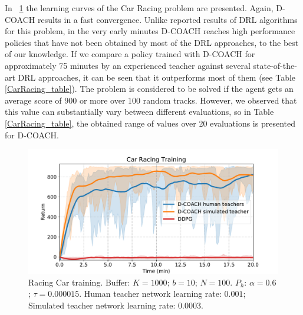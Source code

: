 In \figurename~{\ref{fig:racing_car_results}} the learning curves of the Car Racing problem are presented. Again, D-COACH results in a fast convergence. Unlike reported results of DRL algorithms for this problem, in the very early minutes D-COACH reaches high performance policies that have not been obtained by most of the DRL approaches, to the best of our knowledge. If we compare a policy trained with D-COACH for approximately 75 minutes by an experienced teacher against several state-of-the-art DRL approaches, it can be seen that it outperforms most of them (see Table \ref{CarRacing_table}). The problem is considered to be solved if the agent gets an average score of 900 or more over 100 random tracks. However, we observed that this value can substantially vary between different evaluations, so in Table \ref{CarRacing_table}, the obtained range of values over 20 evaluations is presented for D-COACH.
\vspace{-0.4cm}

\begin{figure}[t]
    \centering
    \vspace{-0.2cm}
    \includegraphics[width=0.9\linewidth]{imagenes/cap3/offline_car_racing_humans.pdf}
    \vspace{-0.2cm}
    \caption{Racing Car training. Buffer: $K = 1000$; $b = 10$; $N = 100$. $P_{h}$: $\alpha = 0.6$; $\tau = 0.000015$. Human teacher network learning rate: $0.001$; Simulated teacher network learning rate: $0.0003$.}
    \label{fig:racing_car_results}
\end{figure}

